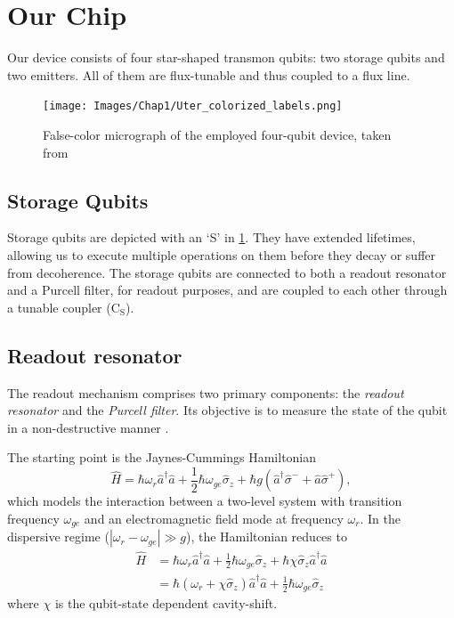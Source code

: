 \section{Our Chip}
\label{sec:our_setup}

Our device consists of four star-shaped transmon qubits: two storage qubits and two emitters.
All of them are flux-tunable and thus coupled to a flux line.

\begin{figure}
    \centering
    \texttt{[image: Images/Chap1/Uter\_colorized\_labels.png]}
    \caption{False-color micrograph of the employed four-qubit device, taken from \cite{HernandezAnton2023}}
    \label{fig:our_chip}
\end{figure}

\subsection{Storage Qubits}
Storage qubits are depicted with an ‘S' in \cref{fig:our_chip}.
They have extended lifetimes, allowing us to execute multiple operations on them before they decay or suffer from decoherence.
The storage qubits are connected to both a readout resonator and a Purcell filter, for readout purposes, and are coupled to each other through a tunable coupler ($\text{C}_\text{S}$).

\subsection{Readout resonator}

The readout mechanism comprises two primary components: the \emph{readout resonator} and the \emph{Purcell filter}. 
Its objective is to measure the state of the qubit in a non-destructive manner \cite{singleshot_readout}.

The starting point is the Jaynes-Cummings Hamiltonian \cite{haroche2006exploring}
\begin{equation}
    \hat{H} = \hbar \omega_r \hat{a}^\dagger \hat{a} + \frac{1}{2} \hbar \omega_{ge} \hat{\sigma}_z + \hbar g (\hat{a}^\dagger \hat{\sigma}^- + \hat{a} \hat{\sigma}^+) ,
\end{equation}
which models the interaction between a two-level system with transition frequency $\omega_{ge}$ and an electromagnetic field mode at frequency $\omega_r$.
In the dispersive regime ($|\omega_r - \omega_{ge}| \gg g$), the Hamiltonian reduces to \cite{transmon_regime}
\begin{align}
    \hat{H} &= \hbar \omega_r \hat{a}^\dagger \hat{a} + \frac{1}{2} \hbar \omega_{ge} \hat{\sigma}_z + \hbar \chi \hat{\sigma}_z \hat{a}^\dagger \hat{a} \\
    &= \hbar (\omega_r + \chi \hat{\sigma}_z ) \hat{a}^\dagger \hat{a} +
    \frac{1}{2} \hbar \omega_{ge} \hat{\sigma}_z 
\end{align}
where $\chi$ is the qubit-state dependent cavity-shift.


